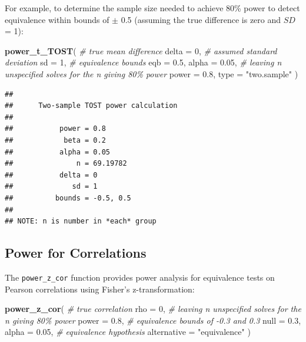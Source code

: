\documentclass[]{interact}
\theoremstyle{plain}%
\theoremstyle{definition}
\theoremstyle{remark}
\newenvironment{Shaded}{\begin{snugshade}}{\end{snugshade}}
\newcommand{\AttributeTok}[1]{\textcolor[rgb]{0.13,0.29,0.53}{#1}}
\newcommand{\CommentTok}[1]{\textcolor[rgb]{0.56,0.35,0.01}{\textit{#1}}}
\newcommand{\DecValTok}[1]{\textcolor[rgb]{0.00,0.00,0.81}{#1}}
\newcommand{\FloatTok}[1]{\textcolor[rgb]{0.00,0.00,0.81}{#1}}
\newcommand{\FunctionTok}[1]{\textcolor[rgb]{0.13,0.29,0.53}{\textbf{#1}}}
\newcommand{\NormalTok}[1]{#1}
\newcommand{\StringTok}[1]{\textcolor[rgb]{0.31,0.60,0.02}{#1}}
\begin{document}
For example, to determine the sample size needed to achieve 80\% power
to detect equivalence within bounds of \(\pm\) 0.5 (assuming the true
difference is zero and \(SD\) = 1):

\begin{Shaded}
\begin{Highlighting}[]
\FunctionTok{power\_t\_TOST}\NormalTok{(}
  \CommentTok{\# true mean difference}
  \AttributeTok{delta =} \DecValTok{0}\NormalTok{,}
  \CommentTok{\# assumed standard deviation}
  \AttributeTok{sd =} \DecValTok{1}\NormalTok{,}
  \CommentTok{\# equivalence bounds}
  \AttributeTok{eqb =} \FloatTok{0.5}\NormalTok{,}
  \AttributeTok{alpha =} \FloatTok{0.05}\NormalTok{,}
  \CommentTok{\# leaving n unspecified solves for the n giving 80\% power}
  \AttributeTok{power =} \FloatTok{0.8}\NormalTok{,}
  \AttributeTok{type =} \StringTok{"two.sample"}
\NormalTok{)}
\end{Highlighting}
\end{Shaded}

\begin{verbatim}
## 
##      Two-sample TOST power calculation 
## 
##           power = 0.8
##            beta = 0.2
##           alpha = 0.05
##               n = 69.19782
##           delta = 0
##              sd = 1
##          bounds = -0.5, 0.5
## 
## NOTE: n is number in *each* group
\end{verbatim}

\subsection{Power for Correlations}\label{power-for-correlations}

The \texttt{power\_z\_cor} function provides power analysis for
equivalence tests on Pearson correlations using Fisher's
z-transformation:

\begin{Shaded}
\begin{Highlighting}[]
\FunctionTok{power\_z\_cor}\NormalTok{(}
  \CommentTok{\# true correlation}
  \AttributeTok{rho =} \DecValTok{0}\NormalTok{,}
  \CommentTok{\# leaving n unspecified solves for the n giving 80\% power}
  \AttributeTok{power =} \FloatTok{0.8}\NormalTok{,}
  \CommentTok{\# equivalence bounds of {-}0.3 and 0.3}
  \AttributeTok{null =} \FloatTok{0.3}\NormalTok{,}
  \AttributeTok{alpha =} \FloatTok{0.05}\NormalTok{,}
  \CommentTok{\# equivalence hypothesis}
  \AttributeTok{alternative =} \StringTok{"equivalence"}
\NormalTok{)}
\end{Highlighting}
\end{Shaded}
\end{document}
